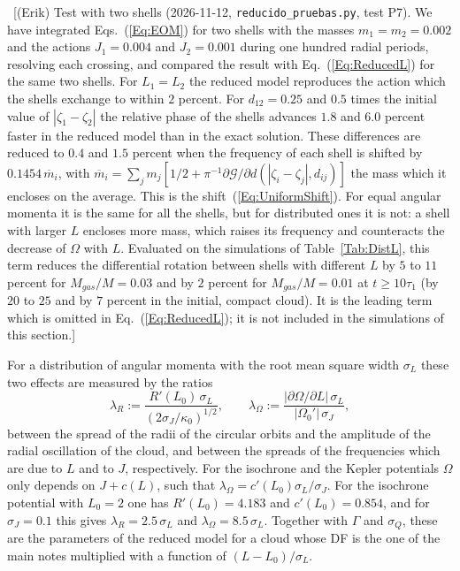 \documentclass[prd,aps,nofootinbib,superscriptaddress,amsmath,amssymb]{revtex4}
\newcommand{\EJ}[1]{{\color{red}~\textsf{[(Erik) #1]}}}
\begin{document}
\EJ{Test with two shells (2026-11-12, \texttt{reducido\_pruebas.py}, test P7). We have integrated Eqs.~(\ref{Eq:EOM}) for two shells with the masses $m_1 = m_2 = 0.002$ and the actions $J_1 = 0.004$ and $J_2 = 0.001$ during one hundred radial periods, resolving each crossing, and compared the result with Eq.~(\ref{Eq:ReducedL}) for the same two shells. For $L_1 = L_2$ the reduced model reproduces the action which the shells exchange to within $2$ percent. For $d_{12} = 0.25$ and $0.5$ times the initial value of $|\zeta_1 - \zeta_2|$ the relative phase of the shells advances $1.8$ and $6.0$ percent faster in the reduced model than in the exact solution. These differences are reduced to $0.4$ and $1.5$ percent when the frequency of each shell is shifted by $0.1454\,\overline{m}_i$, with $\overline{m}_i = \sum_j m_j[1/2 + \pi^{-1}\partial\mathcal{G}/\partial d(|\zeta_i - \zeta_j|,d_{ij})]$ the mass which it encloses on the average. This is the shift~(\ref{Eq:UniformShift}). For equal angular momenta it is the same for all the shells, but for distributed ones it is not: a shell with larger $L$ encloses more mass, which raises its frequency and counteracts the decrease of $\Omega$ with $L$. Evaluated on the simulations of Table~\ref{Tab:DistL}, this term reduces the differential rotation between shells with different $L$ by $5$ to $11$ percent for $M_{gas}/M = 0.03$ and by $2$ percent for $M_{gas}/M = 0.01$ at $t\geq 10\tau_1$ (by $20$ to $25$ and by $7$ percent in the initial, compact cloud). It is the leading term which is omitted in Eq.~(\ref{Eq:ReducedL}); it is not included in the simulations of this section.}

For a distribution of angular momenta with the root mean square width $\sigma_L$ these two effects are measured by the ratios
\begin{equation}
\lambda_R := \frac{R'(L_0)\,\sigma_L}{(2\sigma_J/\kappa_0)^{1/2}},\qquad
\lambda_\Omega := \frac{|\partial\Omega/\partial L|\,\sigma_L}{|\Omega_0'|\,\sigma_J},
\label{Eq:lambdas}
\end{equation}
between the spread of the radii of the circular orbits and the amplitude of the radial oscillation of the cloud, and between the spreads of the frequencies which are due to $L$ and to $J$, respectively. For the isochrone and the Kepler potentials $\Omega$ only depends on $J + c(L)$, such that $\lambda_\Omega = c'(L_0)\sigma_L/\sigma_J$. For the isochrone potential with $L_0 = 2$ one has $R'(L_0) = 4.183$ and $c'(L_0) = 0.854$, and for $\sigma_J = 0.1$ this gives $\lambda_R = 2.5\,\sigma_L$ and $\lambda_\Omega = 8.5\,\sigma_L$. Together with $\Gamma$ and $\sigma_Q$, these are the parameters of the reduced model for a cloud whose DF is the one of the main notes multiplied with a function of $(L - L_0)/\sigma_L$.
\end{document}
